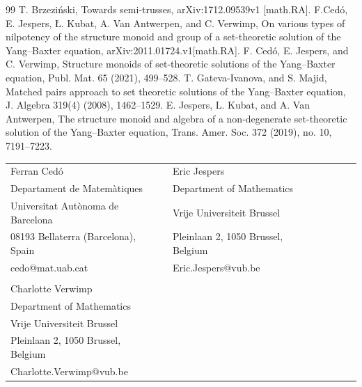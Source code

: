 \documentclass[10pt]{article}
\begin{document}
\begin{thebibliography}{99}
\itemsep=-2pt
 T. Brzezi\'{n}ski, Towards semi-trusses,
arXiv:1712.09539v1 [math.RA].
 F.Ced\'o, E. Jespers, {\L}. Kubat, A. Van Antwerpen, and C. Verwimp, On various types of nilpotency of the structure monoid and group of a set-theoretic solution of the Yang--Baxter equation, arXiv:2011.01724.v1[math.RA].
 F. Ced\'o, E. Jespers, and C. Verwimp, Structure monoids of set-theoretic solutions of the Yang--Baxter equation, Publ. Mat. 65 (2021), 499--528.
 T. Gateva-Ivanova, and S. Majid, Matched pairs approach to set theoretic solutions of the Yang–Baxter equation, J. Algebra 319(4) (2008), 1462–1529. 
 E. Jespers, L. Kubat, and A. Van Antwerpen, The structure monoid and algebra of a non-degenerate
set-theoretic solution of the Yang--Baxter equation, Trans. Amer. Soc.  372 (2019), no. 10, 7191--7223.
\end{thebibliography}
\vspace{30pt}
 \noindent \begin{tabular}{llllllll}
  Ferran Ced\'o && Eric Jespers\\
 Departament de Matem\`atiques &&  Department of Mathematics \\
 Universitat Aut\`onoma de Barcelona &&  Vrije Universiteit Brussel \\
08193 Bellaterra (Barcelona), Spain    && Pleinlaan 2, 1050 Brussel, Belgium \\
 cedo@mat.uab.cat && Eric.Jespers@vub.be \\ \\
 Charlotte Verwimp && \\ Department of
Mathematics &&
\\  Vrije Universiteit Brussel &&\\
Pleinlaan 2, 1050 Brussel, Belgium  &&\\
Charlotte.Verwimp@vub.be &&
\end{tabular}
\end{document}
